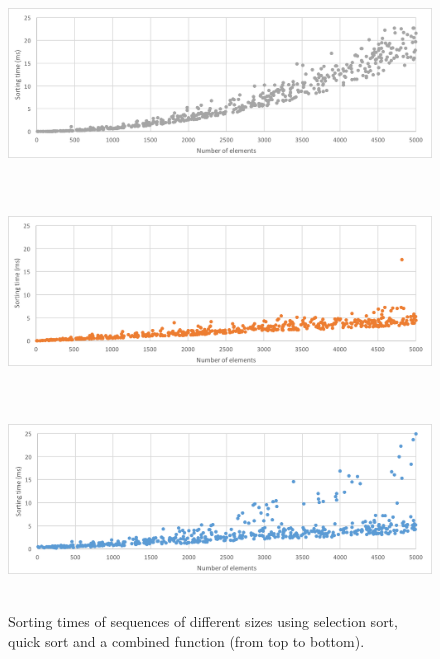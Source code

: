 \begin{figure}[h!]
	\captionsetup{justification=centering,margin=0.5cm}
\centerline{
	\mbox{
		\includegraphics[width=130mm]{./img/sort_all_select.png}
	}
}
\centerline{
	\mbox{
		\includegraphics[width=130mm]{./img/sort_all_quick.png}
	}
}
\centerline{
	\mbox{
		\includegraphics[width=130mm]{./img/sort_all_combined.png}
	}
}
	\caption{Sorting times of sequences of different sizes using selection sort, quick sort and a combined function (from top to bottom).}
	\label{fig:sorting_graph_all}
\end{figure}

